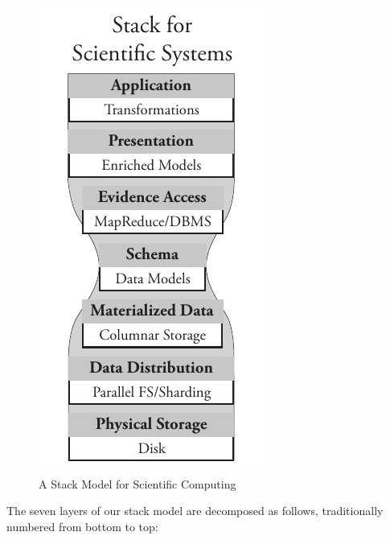 \documentclass{acm_proc_article-sp}
\begin{document}
\begin{figure}[h]
\begin{center}
\includegraphics[width=0.6\linewidth]{stack-model.pdf}
\end{center}
\caption{A Stack Model for Scientific Computing}
\label{fig:stack-model}
\end{figure}

The seven layers of our stack model are decomposed as follows, traditionally numbered from bottom to
top:
\end{document}
